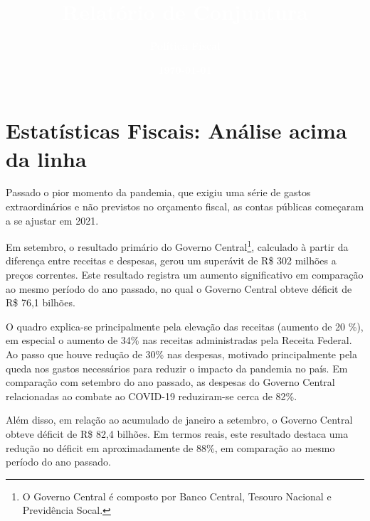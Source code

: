 \documentclass[100,a4paperpaper,]{article}
\title{\textbf{\textcolor{white}{Relatório de Conjuntura}}}
\author{\textbf{\textcolor{white}{Política Fiscal}}}
\date{\textbf{\textcolor{white}{\today}}}
\begin{document}
\renewcommand{\contentsname}{Sumário}


\maketitle
\tableofcontents
\clearpage

\section{Estatísticas Fiscais: Análise acima da linha} 
 \vspace{0.5cm}

Passado o pior momento da pandemia, que exigiu uma série de gastos
extraordinários e não previstos no orçamento fiscal, as contas públicas
começaram a se ajustar em 2021.

Em setembro, o resultado primário do Governo
Central\footnote{O Governo Central é composto por Banco Central, Tesouro Nacional e Previdência Socal.},
calculado à partir da diferença entre receitas e despesas, gerou um
superávit de R\$ 302 milhões a preços correntes. Este resultado registra
um aumento significativo em comparação ao mesmo período do ano passado,
no qual o Governo Central obteve déficit de R\$ 76,1 bilhões.

O quadro explica-se principalmente pela elevação das receitas (aumento
de 20 \%), em especial o aumento de 34\% nas receitas administradas pela
Receita Federal. Ao passo que houve redução de 30\% nas despesas,
motivado principalmente pela queda nos gastos necessários para reduzir o
impacto da pandemia no país. Em comparação com setembro do ano passado,
as despesas do Governo Central relacionadas ao combate ao COVID-19
reduziram-se cerca de 82\%.

Além disso, em relação ao acumulado de janeiro a setembro, o Governo
Central obteve déficit de R\$ 82,4 bilhões. Em termos reais, este
resultado destaca uma redução no déficit em aproximadamente de 88\%, em
comparação ao mesmo período do ano passado.

\begingroup\fontsize{13}{15}\selectfont
\end{document}
